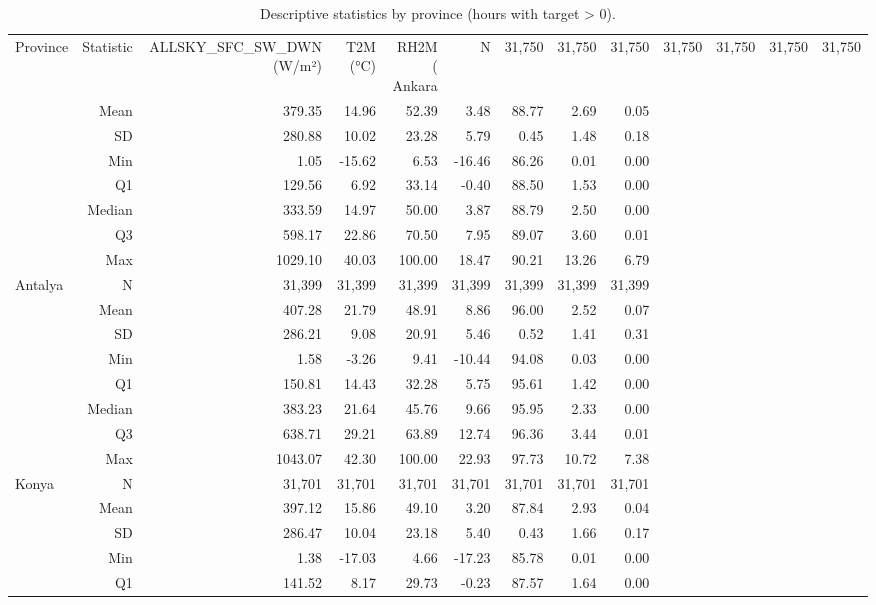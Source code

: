 \begin{table}[htbp]
\centering
\caption{Descriptive statistics by province (hours with target > 0).}
\label{tab:descriptive_stats_by_city_positive}
\begin{tabular}{lrrrrrrrr}
\hline
Province & Statistic & ALLSKY\_SFC\_SW\_DWN (W/m²) & T2M (°C) & RH2M (%
\hline
Ankara & N & 31,750 & 31,750 & 31,750 & 31,750 & 31,750 & 31,750 & 31,750 \\
 & Mean & 379.35 & 14.96 & 52.39 & 3.48 & 88.77 & 2.69 & 0.05 \\
 & SD & 280.88 & 10.02 & 23.28 & 5.79 & 0.45 & 1.48 & 0.18 \\
 & Min & 1.05 & -15.62 & 6.53 & -16.46 & 86.26 & 0.01 & 0.00 \\
 & Q1 & 129.56 & 6.92 & 33.14 & -0.40 & 88.50 & 1.53 & 0.00 \\
 & Median & 333.59 & 14.97 & 50.00 & 3.87 & 88.79 & 2.50 & 0.00 \\
 & Q3 & 598.17 & 22.86 & 70.50 & 7.95 & 89.07 & 3.60 & 0.01 \\
 & Max & 1029.10 & 40.03 & 100.00 & 18.47 & 90.21 & 13.26 & 6.79 \\
Antalya & N & 31,399 & 31,399 & 31,399 & 31,399 & 31,399 & 31,399 & 31,399 \\
 & Mean & 407.28 & 21.79 & 48.91 & 8.86 & 96.00 & 2.52 & 0.07 \\
 & SD & 286.21 & 9.08 & 20.91 & 5.46 & 0.52 & 1.41 & 0.31 \\
 & Min & 1.58 & -3.26 & 9.41 & -10.44 & 94.08 & 0.03 & 0.00 \\
 & Q1 & 150.81 & 14.43 & 32.28 & 5.75 & 95.61 & 1.42 & 0.00 \\
 & Median & 383.23 & 21.64 & 45.76 & 9.66 & 95.95 & 2.33 & 0.00 \\
 & Q3 & 638.71 & 29.21 & 63.89 & 12.74 & 96.36 & 3.44 & 0.01 \\
 & Max & 1043.07 & 42.30 & 100.00 & 22.93 & 97.73 & 10.72 & 7.38 \\
Konya & N & 31,701 & 31,701 & 31,701 & 31,701 & 31,701 & 31,701 & 31,701 \\
 & Mean & 397.12 & 15.86 & 49.10 & 3.20 & 87.84 & 2.93 & 0.04 \\
 & SD & 286.47 & 10.04 & 23.18 & 5.40 & 0.43 & 1.66 & 0.17 \\
 & Min & 1.38 & -17.03 & 4.66 & -17.23 & 85.78 & 0.01 & 0.00 \\
 & Q1 & 141.52 & 8.17 & 29.73 & -0.23 & 87.57 & 1.64 & 0.00 \\

\end{tabular}
\end{table}
